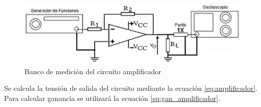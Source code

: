\documentclass[10pt,spanish,a4paper,openany,notitlepage]{article}
\begin{document}
\begin{figure}[H]
\centering
\includegraphics[scale=0.8]{circuitos/A1.png}
\caption{Banco de medición del circuito amplificador}
\label{fig:amplificador}
\end{figure}

Se calcula la tensión de salida del circuito mediante la ecuación \ref{eq:amplificador}. Para calcular ganancia se utilizará la ecuación \ref{eq:gan_amplificador}.
\end{document}
